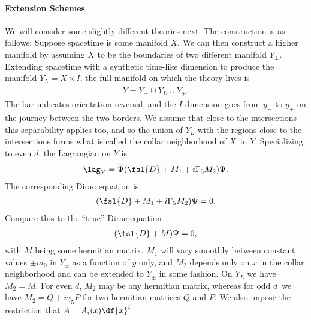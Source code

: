 \paragraph{Extension Schemes}
We will consider some slightly different theories next. The construction is as follows: Suppose spacetime is some manifold $X$. We can then construct a higher manifold by assuming $X$ to be the boundaries of two different manifold $Y_{\pm}$. Extending spacetime with a synthetic time-like dimension to produce the manifold $Y_{L} = X\times I$, the full manifold on which the theory lives is
\begin{align*}
	Y = \overline{Y}_{-}\cup Y_{L}\cup Y_{+}.
\end{align*}
The bar indicates orientation reversal, and the $I$ dimension goes from $y_{-}$ to $y_{+}$ on the journey between the two borders. We assume that close to the intersections this separability applies too, and so the union of $Y_{L}$ with the regions close to the intersections forms what is called the collar neighborhood of $X$ in $Y$. Specializing to even $d$, the Lagrangian on $Y$ is
\begin{align*}
	\lag_{Y} = \overline{\Psi}(\fsl{D} + M_{1} + i\Gamma_{5}M_{2})\Psi.
\end{align*}
The corresponding Dirac equation is
\begin{align*}
	(\fsl{D} + M_{1} + i\Gamma_{5}M_{2})\Psi = 0.
\end{align*}
Compare this to the ``true'' Dirac equation
\begin{align*}
	(\fsl{D} + M)\Psi = 0,
\end{align*}
with $M$ being some hermitian matrix. $M_{1}$ will vary smoothly between constant values $\pm m_{0}$ in $Y_{\pm}$ as a function of $y$ only, and $M_{2}$ depends only on $x$ in the collar neighborhood and can be extended to $Y_{\pm}$ in some fashion. On $Y_{L}$ we have $M_{2} = M$. For even $d$, $M_{2}$ may be any hermitian matrix, whereas for odd $d$ we have $M_{2} = Q + i\gamma_{5}P$ for two hermitian matrices $Q$ and $P$. We also impose the restriction that $A = A_{i}(x)\df{x}^{i}$.

